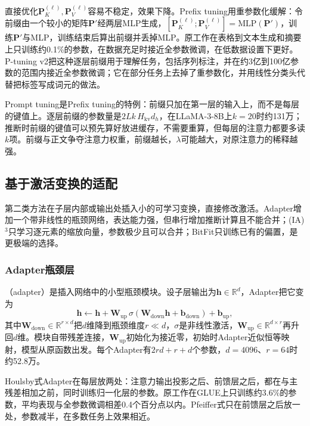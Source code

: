 直接优化$\bm P_K^{(\ell)},\bm P_V^{(\ell)}$容易不稳定，效果下降。Prefix tuning用重参数化缓解：令前缀由一个较小的矩阵$\bm P'$经两层MLP生成，$[\bm P_K^{(\ell)};\bm P_V^{(\ell)}]=\mathrm{MLP}(\bm P')$，训练$\bm P'$与MLP，训练结束后算出前缀并丢掉MLP。原工作在表格到文本生成和摘要上只训练约0.1\%的参数，在数据充足时接近全参数微调，在低数据设置下更好。P-tuning v2把这种逐层前缀用于理解任务，包括序列标注，并在约3亿到100亿参数的范围内接近全参数微调；它在部分任务上去掉了重参数化，并用线性分类头代替把标签写成词元的做法。

Prompt tuning是Prefix tuning的特例：前缀只加在第一层的输入上，而不是每层的键值上。逐层前缀的参数量是$2Lk\,H_{\mathrm{kv}}d_h$，在LLaMA-3-8B上$k=20$时约131万；推断时前缀的键值可以预先算好放进缓存，不需要重算，但每层的注意力都要多读$k$项。前缀与正文争夺注意力权重，前缀越长，$\lambda$可能越大，对原注意力的稀释越强。

\subsection{基于激活变换的适配}
\label{sec:nlp-sft-activation}

第二类方法在子层内部或输出处插入小的可学习变换，直接修改激活。Adapter增加一个带非线性的瓶颈网络，表达能力强，但串行增加推断计算且不能合并；(IA)$^3$只学习逐元素的缩放向量，参数极少且可以合并；BitFit只训练已有的偏置，是更极端的选择。

\subsubsection{Adapter瓶颈层}
\label{sec:nlp-sft-adapter}

（adapter）是插入网络中的小型瓶颈模块。设子层输出为$\bm h\in\mathbb R^{d}$，Adapter把它变为
\begin{equation}
 \bm h\leftarrow\bm h+\bm W_{\mathrm{up}}\,\sigma(\bm W_{\mathrm{down}}\bm h+\bm b_{\mathrm{down}})+\bm b_{\mathrm{up}},
 \label{eq:nlp-sft-adapter}
\end{equation}
其中$\bm W_{\mathrm{down}}\in\mathbb R^{r\times d}$把$d$维降到瓶颈维度$r\ll d$，$\sigma$是非线性激活，$\bm W_{\mathrm{up}}\in\mathbb R^{d\times r}$再升回$d$维。模块自带残差连接，$\bm W_{\mathrm{up}}$初始化为接近零，初始时Adapter近似恒等映射，模型从原函数出发。每个Adapter有$2rd+r+d$个参数，$d=4096$、$r=64$时约52.8万。

Houlsby式Adapter在每层放两处：注意力输出投影之后、前馈层之后，都在与主残差相加之前，同时训练归一化层的参数。原工作在GLUE上只训练约3.6\%的参数，平均表现与全参数微调相差0.4个百分点以内。Pfeiffer式只在前馈层之后放一处，参数减半，在多数任务上效果相近。

